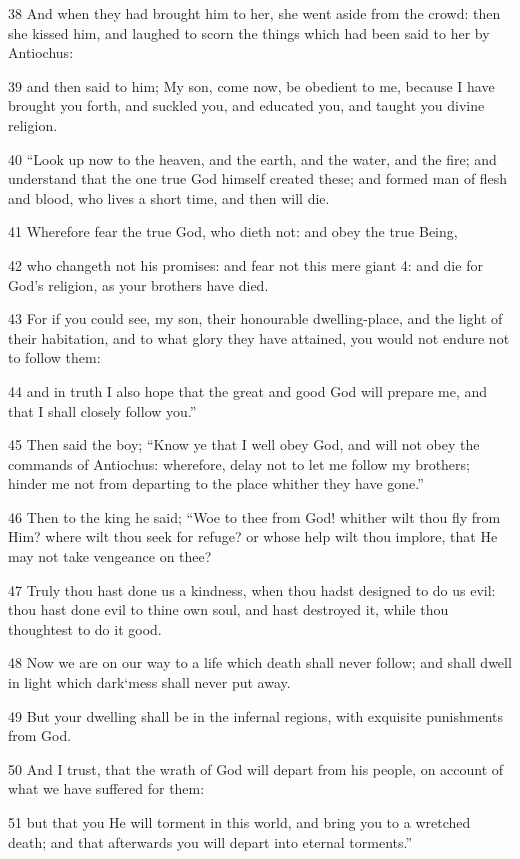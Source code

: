 38 And when they had brought him to her, she went aside from the crowd: then she kissed him, and laughed to scorn the things which had been said to her by Antiochus: 

39 and then said to him; My son, come now, be obedient to me, because I have brought you forth, and suckled you, and educated you, and taught you divine religion. 

40 “Look up now to the heaven, and the earth, and the water, and the fire; and understand that the one true God himself created these; and formed man of flesh and blood, who lives a short time, and then will die. 

41 Wherefore fear the true God, who dieth not: and obey the true Being, 

42 who changeth not his promises: and fear not this mere giant 4: and die for God’s religion, as your brothers have died. 

43 For if you could see, my son, their honourable dwelling-place, and the light of their habitation, and to what glory they have attained, you would not endure not to follow them: 

44 and in truth I also hope that the great and good God will prepare me, and that I shall closely follow you.” 

45 Then said the boy; “Know ye that I well obey God, and will not obey the commands of Antiochus: wherefore, delay not to let me follow my brothers; hinder me not from departing to the place whither they have gone.” 

46 Then to the king he said; “Woe to thee from God! whither wilt thou fly from Him? where wilt thou seek for refuge? or whose help wilt thou implore, that He may not take vengeance on thee? 

47 Truly thou hast done us a kindness, when thou hadst designed to do us evil: thou hast done evil to thine own soul, and hast destroyed it, while thou thoughtest to do it good. 

48 Now we are on our way to a life which death shall never follow; and shall dwell in light which dark‘mess shall never put away. 

49 But your dwelling shall be in the infernal regions, with exquisite punishments from God. 

50 And I trust, that the wrath of God will depart from his people, on account of what we have suffered for them: 

51 but that you He will torment in this world, and bring you to a wretched death; and that afterwards you will depart into eternal torments.” 

